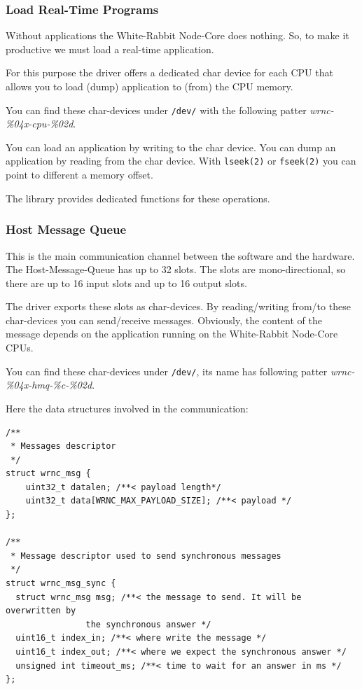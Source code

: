 \documentclass[a4paper,10pt]{article}
\begin{document}
\subsubsection{Load Real-Time Programs}%
Without applications the White-Rabbit Node-Core does nothing. So, to
make it productive we must load a real-time application.

For this purpose the driver offers a dedicated char device for each
CPU that allows you to load (dump) application to (from) the CPU
memory.

You can find these char-devices under \texttt{/dev/} with the
following patter \textit{wrnc-\%04x-cpu-\%02d}.

You can load an application by writing to the char device. You can
dump an application by reading from the char device. With
\texttt{lseek(2)} or \texttt{fseek(2)} you can point to different
a memory offset.

The library provides dedicated functions for these operations.


\subsubsection{Host Message Queue}%
This is the main communication channel between the software and the
hardware. The Host-Message-Queue has up to 32 slots. The slots are
mono-directional, so there are up to 16 input slots and up to 16
output slots.

The driver exports these slots as char-devices. By reading/writing
from/to these char-devices you can send/receive messages. Obviously,
the content of the message depends on the application running on the
White-Rabbit Node-Core CPUs.

You can find these char-devices under \texttt{/dev/}, its name has
following patter \textit{wrnc-\%04x-hmq-\%c-\%02d}.

Here the data structures involved in the communication:

\begin{lstlisting}
/**
 * Messages descriptor
 */
struct wrnc_msg {
	uint32_t datalen; /**< payload length*/
	uint32_t data[WRNC_MAX_PAYLOAD_SIZE]; /**< payload */
};

/**
 * Message descriptor used to send synchronous messages
 */
struct wrnc_msg_sync {
  struct wrnc_msg msg; /**< the message to send. It will be overwritten by
				the synchronous answer */
  uint16_t index_in; /**< where write the message */
  uint16_t index_out; /**< where we expect the synchronous answer */
  unsigned int timeout_ms; /**< time to wait for an answer in ms */
};
\end{lstlisting}
\end{document}
